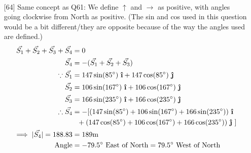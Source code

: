 \documentclass[11pt]{article}
\newcommand{\uvec}[1]{\boldsymbol{\hat{\textbf{#1}}}}
\begin{document}
\begin{enumerate}
\begin{align*}
			\end{align*}
		\pagebreak
		\item[{[64]}] Same concept as Q61: We define $\uparrow$ and $\rightarrow$ as positive, with angles going clockwise from North as positive. (The sin and cos used in this question would be a bit different/they are opposite because of the way the angles used are defined.)
			\begin{align*}
				\vec{S_1} + \vec{S_2} + \vec{S_3} + \vec{S_4} &= 0 \\ 
				\vec{S_4} &= -(\vec{S_1} + \vec{S_2} + \vec{S_3}) \\
				\because \vec{S_1} &= 147\sin(85\degree) ~\uvec{\i} + 147\cos(85\degree) ~\uvec{\j} \\
				\vec{S_2} &= 106\sin(167\degree)~\uvec{\i} + 106\cos(167\degree) ~\uvec{\j} \\
				\vec{S_3} &= 166\sin(235\degree)~\uvec{\i} + 166\cos(235\degree) ~\uvec{\j} \\
				\therefore \vec{S_4} &= -[(147\sin(85\degree) + 106\sin(167\degree) + 166\sin(235\degree))~\uvec{\i} \\
				&~~+  (147\cos(85\degree) + 106\cos(167\degree) + 166\cos(235\degree))~\uvec{\j}~] \\
				\implies |\vec{S_4}| = 188.83 &= 189 \text{m} \\
				\text{Angle} &= -79.5 \degree ~\text{East of North} = 79.5\degree ~\text{West of North}
			\end{align*}
		
	\end{enumerate}
	
\end{document}

